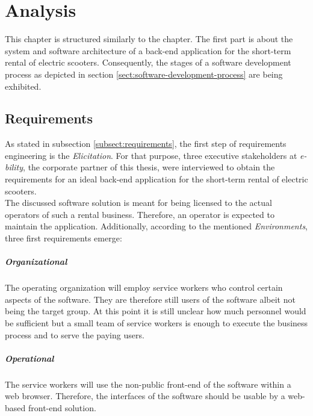 \documentclass[12pt,a4paper,twoside]{report}
\begin{document}
\chapter{Analysis} \label{chap:analysis}


This chapter is structured similarly to the \textit{}
chapter. The first part is about the system and software architecture of
a back-end application for the short-term rental of electric scooters.
Consequently, the stages of a software development process as depicted
in section \ref{sect:software-development-process} are being exhibited.


\section{Requirements} \label{subsect:app-requirements}

As stated in subsection \ref{subsect:requirements}, the first step of
requirements engineering is the \textit{Elicitation}.
For that purpose, three executive stakeholders
at \textit{e-bility}, the corporate partner of this thesis, were interviewed
to obtain the requirements for an ideal back-end application for the
short-term rental of electric scooters.\\
The discussed software solution is meant for being licensed to
the actual operators of such a rental business. Therefore, an operator
is expected to maintain the application. Additionally, according to the
mentioned \textit{Environments}, three first requirements emerge:

\paragraph{Organizational}
The operating organization will employ service workers who
control certain aspects of the software. They are therefore still users of the
software albeit not being the target group. At this point it is still unclear
how much personnel would be sufficient but a small team of service workers is
enough to execute the business process and to serve the paying users.

\paragraph{Operational}
The service workers will use the non-public front-end of the software within a
web browser. Therefore, the interfaces of the software should be usable by
a web-based front-end solution.
\end{document}
